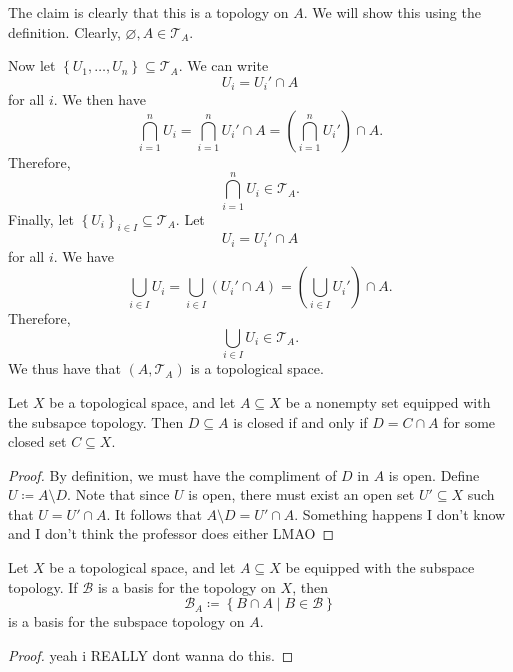 The claim is clearly that this is a topology on $A$. We will show this using the definition. Clearly, $\varnothing,A \in \mathcal{T}_A$.

Now let $\left\{ U_1, \ldots, U_n  \right\} \subseteq \mathcal{T}_A $. We can write
\[
	U_i = U_i' \cap A
\]
for all $i$. We then have
\[
	\bigcap_{i=1}^n U_i = \bigcap_{i=1}^n U_i' \cap A = \left( \bigcap_{i=1}^n U_i' \right) \cap A
.\]
Therefore,
\[
	\bigcap_{i=1}^n U_i \in \mathcal{T}_A
.\]
Finally, let $\left\{ U_i \right\}_{i\in I}\subseteq \mathcal{T}_{A}  $. Let
\[
	U_i = U_i' \cap A
\]
for all $i$. We have
\[
	\bigcup_{i\in I} U_i = \bigcup_{i\in I} \left( U_i' \cap A \right) =\left( \bigcup_{i\in I} U_i' \right) \cap A
.\]
Therefore,
\[
	\bigcup_{i\in I} U_i \in \mathcal{T} _A
.\]
We thus have that $(A,\mathcal{T}_A)$ is a topological space.
\begin{proposition}\label{prp:2.7}
	Let $X$ be a topological space, and let $A\subseteq X$ be a nonempty set equipped with the subsapce topology. Then $D\subseteq A$ is closed if and only if $D=C \cap A$ for some closed set $C\subseteq X$.
\end{proposition}
\begin{proof}
	By definition, we must have the compliment of $D$ in $A$ is open. Define $U\coloneqq A\setminus D$. Note that since $U$ is open, there must exist an open set $U'\subseteq X$ such that $U = U' \cap A$. It follows that $A\setminus D=U' \cap A $. Something happens I don't know and I don't think the professor does either LMAO
\end{proof}
\begin{proposition}\label{prp:2.8}
	Let $X$ be a topological space, and let $A\subseteq X$ be equipped with the subspace topology. If $\mathcal{B} $ is a basis for the topology on $X$, then
	\[
		\mathcal{B}_A \coloneqq \left\{ B \cap A\mid B\in \mathcal{B} \right\} 
	\]
	is a basis for the subspace topology on $A$.
\end{proposition}
\begin{proof}
	yeah i REALLY dont wanna do this.
\end{proof}

